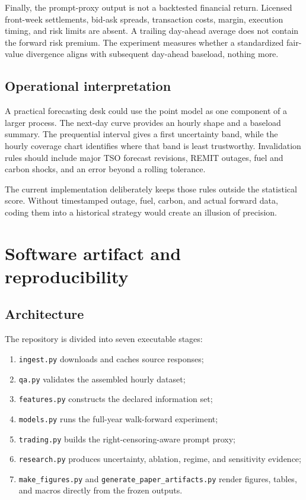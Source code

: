 \documentclass[11pt]{article}
\begin{document}
Finally, the prompt-proxy output is not a backtested financial return.
Licensed front-week settlements, bid-ask spreads, transaction costs, margin,
execution timing, and risk limits are absent.  A trailing day-ahead average
does not contain the forward risk premium.  The experiment measures whether a
standardized fair-value divergence aligns with subsequent day-ahead
baseload, nothing more.

\subsection{Operational interpretation}

A practical forecasting desk could use the point model as one component of a
larger process.  The next-day curve provides an hourly shape and a baseload
summary.  The prequential interval gives a first uncertainty band, while the
hourly coverage chart identifies where that band is least trustworthy.
Invalidation rules should include major TSO forecast revisions, REMIT
outages, fuel and carbon shocks, and an error beyond a rolling tolerance.

The current implementation deliberately keeps those rules outside the
statistical score.  Without timestamped outage, fuel, carbon, and actual
forward data, coding them into a historical strategy would create an illusion
of precision.

\section{Software artifact and reproducibility}

\subsection{Architecture}

The repository is divided into seven executable stages:

\begin{enumerate}[leftmargin=*,itemsep=2pt]
  \item \texttt{ingest.py} downloads and caches source responses;
  \item \texttt{qa.py} validates the assembled hourly dataset;
  \item \texttt{features.py} constructs the declared information set;
  \item \texttt{models.py} runs the full-year walk-forward experiment;
  \item \texttt{trading.py} builds the right-censoring-aware prompt proxy;
  \item \texttt{research.py} produces uncertainty, ablation, regime, and
  sensitivity evidence;
  \item \texttt{make\_figures.py} and
  \texttt{generate\_paper\_artifacts.py} render figures, tables, and macros
  directly from the frozen outputs.
\end{enumerate}
\end{document}

